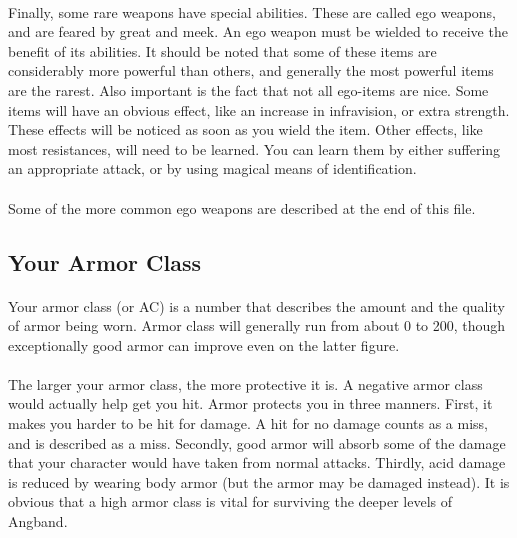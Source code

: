 \paragraph{}
Finally, some rare weapons have special abilities. These are called ego
weapons, and are feared by great and meek. An ego weapon must be wielded
to receive the benefit of its abilities. It should be noted that some of
these items are considerably more powerful than others, and generally the
most powerful items are the rarest. Also important is the fact that not all
ego-items are nice. Some items will have an obvious effect, like an increase
in infravision, or extra strength. These effects will be noticed as soon as
you wield the item. Other effects, like most resistances, will need to be
learned. You can learn them by either suffering an appropriate attack, or
by using magical means of identification.

\paragraph{}
Some of the more common ego weapons are described at the end of this file.

\subsection{Your Armor Class}
\paragraph{}
Your armor class (or AC) is a number that describes the amount and the
quality of armor being worn. Armor class will generally run from about 0 to
200, though exceptionally good armor can improve even on the latter figure.

\paragraph{}
The larger your armor class, the more protective it is. A negative armor
class would actually help get you hit. Armor protects you in three manners.
First, it makes you harder to be hit for damage. A hit for no damage
counts as a miss, and is described as a miss. Secondly, good armor will
absorb some of the damage that your character would have taken from normal
attacks. Thirdly, acid damage is reduced by wearing body armor (but the
armor may be damaged instead). It is obvious that a high armor class is
vital for surviving the deeper levels of Angband.

